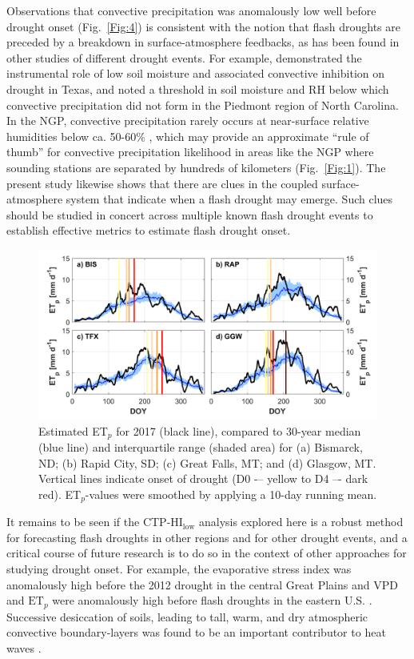 \documentclass[hess, manuscript]{copernicus}
\begin{document}
Observations that convective precipitation was anomalously low well before drought onset (Fig.~\ref{Fig:4}) is consistent with the notion that flash droughts are preceded by a breakdown in surface-atmosphere feedbacks, as has been found in other studies of different drought events. For example, \citet{Myoung_2010a, Myoung_2010b} demonstrated the instrumental role of low soil moisture and associated convective inhibition on drought in Texas, and \citet{Juang_2007a} noted a threshold in soil moisture and RH below which convective precipitation did not form in the Piedmont region of North Carolina. In the NGP, convective precipitation rarely occurs at near-surface relative humidities below ca. 50-60\% \citep{Gerken_2018}, which may provide an approximate ``rule of thumb'' for convective precipitation likelihood in areas like the NGP where sounding stations are separated by hundreds of kilometers (Fig.~\ref{Fig:1}). The present study likewise shows that there are clues in the coupled surface-atmosphere system that indicate when a flash drought may emerge. Such clues should be studied in concert across multiple known flash drought events to establish effective metrics to estimate flash drought onset. 
%
\begin{figure}[t]
\includegraphics[width=12cm]{./Figures/Climatology_ETp.png}
\caption{Estimated ET$_p$ for 2017 (black line), compared to 30-year median (blue line) and interquartile range (shaded area) for (a) Bismarck, ND; (b) Rapid City, SD; (c) Great Falls, MT; and (d) Glasgow, MT. Vertical lines indicate onset of drought (D0 -– yellow to D4 –- dark red). ET$_p$-values were smoothed by applying a 10-day running mean. }\label{Fig:5}
\end{figure}

It remains to be seen if the CTP-$\mathrm{HI_{low}}$  analysis explored here is a robust method for forecasting flash droughts in other regions and for other drought events, and a critical course of future research is to do so in the context of other approaches for studying drought onset. For example, the evaporative stress index was anomalously high before the 2012 drought in the central Great Plains \citep{Otkin_2016} and VPD and $\mathrm{ET}_p$ were anomalously high before flash droughts in the eastern U.S. \citep{Ford_2017}. Successive desiccation of soils, leading to tall, warm, and dry atmospheric convective boundary-layers was found to be an important contributor to heat waves \citep{Miralles_2014}. 
\end{document}
